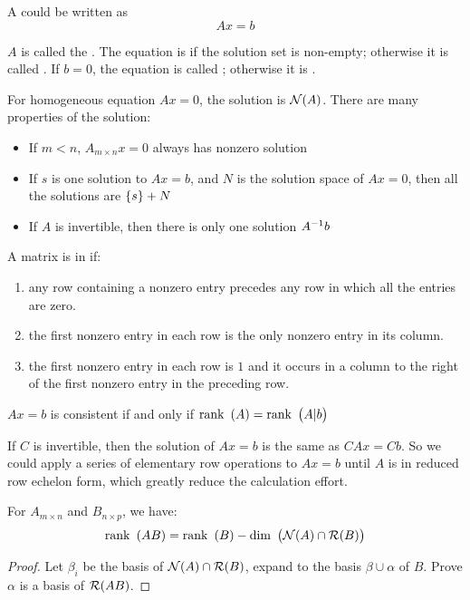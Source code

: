 A  could be written as 
\begin{equation}
    A x = b
\end{equation}

$A$ is called the . The equation is  if the solution set is non-empty; otherwise it is called . If $b=0$, the equation is called ; otherwise it is .

For homogeneous equation $Ax=0$, the solution is $\mathcal{N}(A)$. There are many properties of the solution:
\begin{itemize}
    \item If $m < n$, $A_{m \times n} x = 0$ always has nonzero solution
    \item If $s$ is one solution to $Ax=b$, and $N$ is the solution space of $Ax=0$, then all the solutions are $\set{s} + N$
    \item If $A$ is invertible, then there is only one solution ${A}^{-1} b$
\end{itemize}




\begin{definition}
	A matrix is in  if:
	\begin{enumerate}
		\item any row containing a nonzero entry precedes any row in which all the entries are zero.
		\item the first nonzero entry in each row is the only nonzero entry in its column.
		\item the first nonzero entry in each row is $1$ and it occurs in a column to the right of the first nonzero entry in the preceding row.
	\end{enumerate}
\end{definition}


\begin{theorem}
    $Ax=b$ is consistent if and only if $\displaystyle \mathrm{rank}~\left( A \right) = \displaystyle \mathrm{rank}~\left( A|b \right)$
\end{theorem}

If $C$ is invertible, then the solution of $Ax=b$ is the same as $CAx=Cb$. So we could apply a series of elementary row operations to $Ax=b$ until $A$ is in reduced row echelon form, which greatly reduce the calculation effort. 





\begin{theorem}\label{rankoftwomatrix}
    For $A_{m \times n}$ and $B_{n \times p}$, we have:
    \begin{equation}
        \displaystyle \mathrm{rank}~\left( AB \right) = \displaystyle \mathrm{rank}~\left( B \right) - \displaystyle \mathrm{dim}~\left( \mathcal{N}(A) \cap \mathcal{R}(B) \right)
    \end{equation}
\end{theorem}
\begin{proof}
    Let $\beta_i$ be the basis of $\mathcal{N}(A) \cap \mathcal{R}(B)$, expand to the basis $\beta \cup \alpha$ of $B$. Prove $\alpha$ is a basis of $\mathcal{R}(AB)$.
\end{proof}

